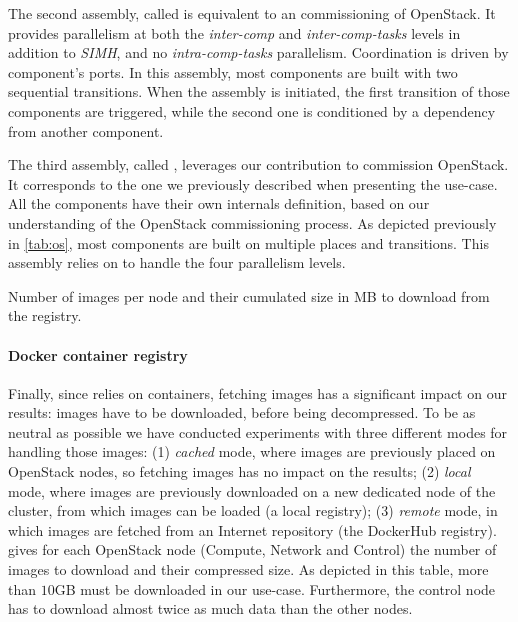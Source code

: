 The second assembly, called \aeoass is equivalent to an \aeolus
commissioning of OpenStack. It provides parallelism at both the
\emph{inter-comp} and \emph{inter-comp-tasks} levels in addition to
\emph{SIMH}, and no \emph{intra-comp-tasks} parallelism. Coordination
is driven by component's ports. In this assembly, most components are
built with two sequential transitions. When the assembly is
initiated, the first transition of those components are triggered,
while the second one is conditioned by a dependency from another
component.
%

The third assembly, called \madass, leverages our contribution to
commission OpenStack. It corresponds to the one we previously
described when presenting the use-case. All the components have their
own internals definition, based on our understanding of the OpenStack
commissioning process. As depicted previously in \cref{tab:os}, most
components are built on multiple places and transitions. This assembly
relies on \mad to handle the four parallelism levels.

\begin{table}
  \begin{center}
    
    \caption{Number of \docker images per node and their cumulated size in MB to
      download from the registry.}
    \label{tab:images}
  \end{center}
\end{table}

\paragraph{Docker container registry}
Finally, since \kolla relies on \docker containers, fetching \docker
images has a significant impact on our results: images have to be
downloaded, before being decompressed. To be as neutral as possible we
have conducted experiments with three different modes for handling
those images: (1) \emph{cached} mode, where images are previously
placed on OpenStack nodes, so fetching \docker images has no impact on
the results; (2) \emph{local} mode, where images are previously
downloaded on a new dedicated node of the cluster, from which images
can be loaded (\ie a local \docker registry); (3) \emph{remote} mode,
in which images are fetched from an Internet repository (\ie the
DockerHub registry).  gives for each OpenStack node
(\ie Compute, Network and Control) the number of \docker images to
download and their compressed size.  As depicted in this table, more
than $10$GB must be downloaded in our use-case.  Furthermore, the
control node has to download almost twice as much data than the other
nodes.

